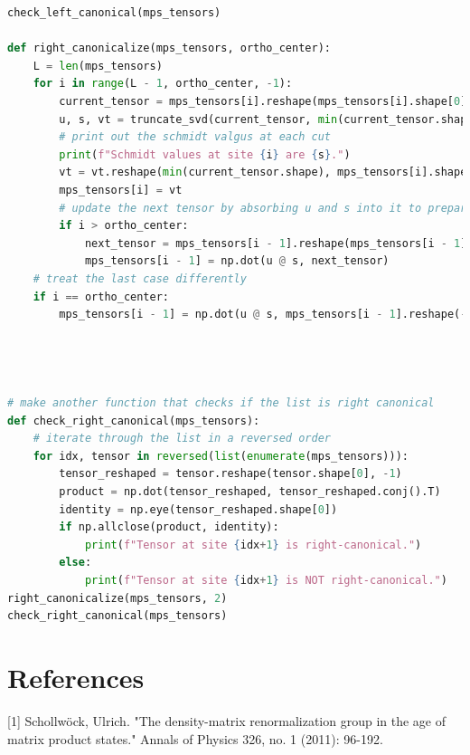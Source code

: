 \documentclass[12pt]{article}
\begin{document}
\begin{lstlisting}[language=Python]
check_left_canonical(mps_tensors)

def right_canonicalize(mps_tensors, ortho_center):
    L = len(mps_tensors)
    for i in range(L - 1, ortho_center, -1):
        current_tensor = mps_tensors[i].reshape(mps_tensors[i].shape[0], -1)
        u, s, vt = truncate_svd(current_tensor, min(current_tensor.shape))
        # print out the schmidt valgus at each cut
        print(f"Schmidt values at site {i} are {s}.")
        vt = vt.reshape(min(current_tensor.shape), mps_tensors[i].shape[1], -1)
        mps_tensors[i] = vt
        # update the next tensor by absorbing u and s into it to prepare for the next svd
        if i > ortho_center:
            next_tensor = mps_tensors[i - 1].reshape(mps_tensors[i - 1].shape[-1], -1)
            mps_tensors[i - 1] = np.dot(u @ s, next_tensor)
    # treat the last case differently
    if i == ortho_center:
        mps_tensors[i - 1] = np.dot(u @ s, mps_tensors[i - 1].reshape(-1, mps_tensors[i - 1].shape[-1])).reshape(mps_tensors[i - 1].shape)
        



# make another function that checks if the list is right canonical
def check_right_canonical(mps_tensors):
    # iterate through the list in a reversed order
    for idx, tensor in reversed(list(enumerate(mps_tensors))):
        tensor_reshaped = tensor.reshape(tensor.shape[0], -1)
        product = np.dot(tensor_reshaped, tensor_reshaped.conj().T)
        identity = np.eye(tensor_reshaped.shape[0])
        if np.allclose(product, identity):
            print(f"Tensor at site {idx+1} is right-canonical.")
        else:
            print(f"Tensor at site {idx+1} is NOT right-canonical.")
right_canonicalize(mps_tensors, 2)
check_right_canonical(mps_tensors)

\end{lstlisting}
\newpage
\section*{References}
[1] Schollwöck, Ulrich. "The density-matrix renormalization group in the age of matrix product states." Annals of Physics 326, no. 1 (2011): 96-192.
\end{document}
